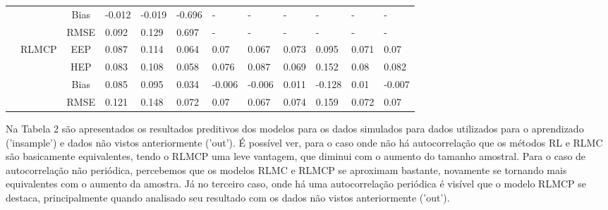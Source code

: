 \documentclass[10pt, a4paper]{article}
\begin{document}
\begin{longtable}[t]{lcclllllllll}
                                                                                                                                &                       & Bias  & -0.012    & -0.019	& -0.696	& -	        & -	        & -	        & -	        & -	        & -         \\ 
                                                                                                                                &                       & RMSE  & 0.092     & 0.129	    & 0.697	    & -	        & -	        & -	        & -	        & -	        & -         \\ \cline{2-12}
                                                                                                                                & \multirow{4}{*}{RLMCP}& EEP   & 0.087     & 0.114	    & 0.064	    & 0.07	    & 0.067	    & 	0.073	& 0.095	    & 0.071	    & 0.07      \\
                                                                                                                                &                       & HEP   & 0.083     & 0.108	    & 0.058	    & 0.076	    & 0.087	    & 	0.069	& 0.152	    & 0.08	    & 0.082     \\
                                                                                                                                &                       & Bias  & 0.085     & 0.095	    & 0.034	    & -0.006	& -0.006	& 	0.011	& -0.128	& 0.01	    & -0.007    \\
                                                                                                                                &                       & RMSE  & 0.121     & 0.148	    & 0.072	    & 0.07	    & 0.067	    & 	0.074	& 0.159	    & 0.072	    & 0.07
\end{longtable}

Na Tabela 2 são apresentados os resultados preditivos dos modelos para os dados simulados para dados utilizados para o aprendizado ('insample') e dados não vistos anteriormente ('out'). É possível ver, para o caso onde não há autocorrelação que os métodos RL e RLMC são basicamente equivalentes, tendo o RLMCP uma leve vantagem, que diminui com o aumento do tamanho amostral. Para o caso de autocorrelação não periódica, percebemos que os modelos RLMC e RLMCP se aproximam bastante, novamente se tornando mais equivalentes com o aumento da amostra. Já no terceiro caso, onde há uma autocorrelação periódica é visível que o modelo RLMCP se destaca, principalmente quando analisado seu resultado com os dados não vistos anteriormente ('out').
\end{document}
